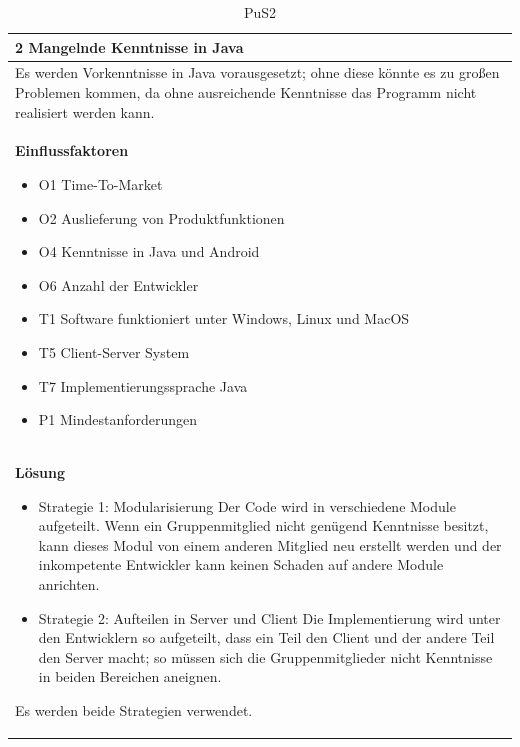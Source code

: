 \documentclass[fontsize=12pt,paper=a4,twoside]{scrartcl}
\begin{document}
\begin{table}[H]
\caption{PuS2}
\begin{tabular}{|p{\textwidth}|}\hline
2 Mangelnde Kenntnisse in Java\\ \hline
Es werden Vorkenntnisse in Java vorausgesetzt; ohne diese könnte es zu großen Problemen kommen, da ohne ausreichende Kenntnisse das Programm nicht realisiert werden kann.\\ \hline
\textbf{Einflussfaktoren}
\begin{itemize}
\item O1 Time-To-Market
\item O2 Auslieferung von Produktfunktionen
\item O4 Kenntnisse in Java und Android
\item O6 Anzahl der Entwickler
\item T1 Software funktioniert unter Windows, Linux und MacOS
\item T5 Client-Server System
\item T7 Implementierungssprache Java
\item P1 Mindestanforderungen
\end{itemize}\\ \hline
\textbf{Lösung}
\begin{itemize}
\item Strategie 1: Modularisierung \leavevmode\newline
Der Code wird in verschiedene Module aufgeteilt. Wenn ein Gruppenmitglied nicht genügend Kenntnisse besitzt, kann dieses Modul von einem anderen Mitglied neu erstellt werden und der inkompetente Entwickler kann keinen Schaden auf andere Module anrichten.
\item Strategie 2: Aufteilen in Server und Client \leavevmode\newline
Die Implementierung wird unter den Entwicklern so aufgeteilt, dass ein Teil den Client und der andere Teil den Server macht; so müssen sich die Gruppenmitglieder nicht Kenntnisse in beiden Bereichen aneignen.
\end{itemize}
Es werden beide Strategien verwendet.\\ \hline
\end{tabular}
\end{table}
\end{document}
